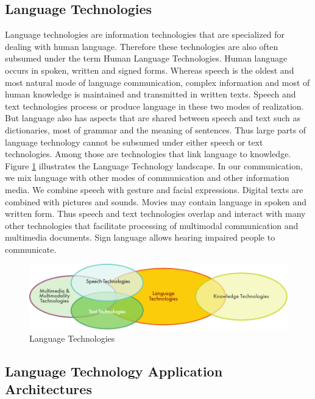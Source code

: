 \begin{multicols}{2}

\subsection{Language Technologies}
Language technologies are information technologies that are
specialized for dealing with human language. Therefore these
technologies are also often subsumed under the term Human Language
Technologies. Human language occurs in spoken, written and signed
forms. Whereas speech is the oldest and most natural mode of language
communication, complex information and most of human knowledge is
maintained and transmitted in written texts. Speech and text
technologies process or produce language in these two modes of
realization. But language also has aspects that are shared between
speech and text such as dictionaries, most of grammar and the meaning
of sentences. Thus large parts of language technology cannot be
subsumed under either speech or text technologies. Among those are
technologies that link language to knowledge. Figure \ref{fig:languagetechnoEng} 
illustrates the Language Technology landscape. In our communication,
we mix language with other modes of communication and other
information media. We combine speech with gesture and facial
expressions. Digital texts are combined with pictures and
sounds. Movies may contain language in spoken and written form. Thus
speech and text technologies overlap and interact with many other
technologies that facilitate processing of multimodal communication
and multimedia documents. Sign language allows hearing impaired people to communicate.

\begin{figure}[htb]
\begin{center}
 \includegraphics[width=\textwidth]{../_media/english/language_technologies} 
\caption{Language Technologies}
\label{fig:languagetechnoEng}
\end{center}
\end{figure}

\subsection{Language Technology Application Architectures}


\end{multicols}
